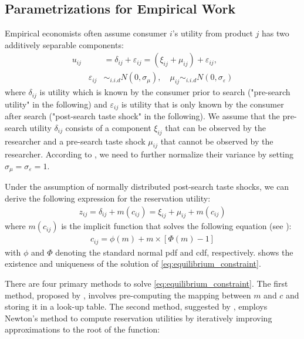 \documentclass[12pt]{article}
\begin{document}
\subsection{Parametrizations for Empirical Work}

Empirical economists often assume consumer $i$'s utility from product $j$ has two additively separable components:
\begin{align}
    u_{i j} & =\delta_{i j}+\varepsilon_{i j}  =\left(\xi_{i j}+\mu_{i j}\right)+\varepsilon_{i j},\\
    \quad \quad \varepsilon_{i j}&\sim_{i.i.d} N(0,\sigma_{\mu}),\quad \mu_{i j} \sim_{i.i.d} N(0,\sigma_{\varepsilon})\nonumber
\end{align}
where \(\delta_{i j}\) is utility which is known by the consumer prior to search ("pre-search
utility" in the following) and \(\varepsilon_{i j}\) is utility that is only known by the consumer
after search ("post-search taste shock" in the following). 
We assume that the pre-search utility
\(\delta_{i j}\) consists of a component \(\xi_{i j}\) that can be observed by the researcher and a pre-search taste shock \(\mu_{i j}\) that
cannot be observed by the researcher. 
According to \cite{ursu2023sequential}, we need to further normalize their variance by setting $\sigma_{\mu}= \sigma_{\varepsilon} =1$. 

Under the assumption of normally distributed post-search taste shocks, we can derive the following
expression for the reservation utility:
\begin{align}
    z_{i j}=\delta_{i j}+m\left(c_{i j}\right)=\xi_{i j}+\mu_{i j}+m\left(c_{i j}\right) 
\end{align}
where \(m\left(c_{i j} \right)\) is the implicit function that solves the following equation (see \cite{kim2010online}):
\begin{align}
    c_{i j}=\phi(m)+m \times[\Phi(m)-1] \label{eq:equilibrium_constraint}
\end{align}
with \(\phi\) and \(\Phi\) denoting the standard normal pdf and cdf, respectively. \cite{weitzman1979optimal} shows the existence and uniqueness of the solution of \eqref{eq:equilibrium_constraint}.


There are four primary methods to solve \eqref{eq:equilibrium_constraint}. The first method, proposed by \cite{kim2010online}, involves pre-computing the mapping between \( m \) and \( c \) and storing it in a look-up table. The second method, suggested by \cite{jiang2021consumer}, employs Newton's method to compute reservation utilities by iteratively improving approximations to the root of the function:
\end{document}
